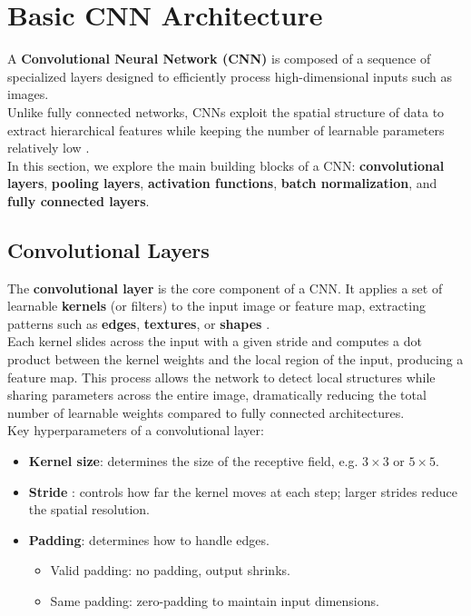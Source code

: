 \chapter{Basic CNN Architecture}
\label{ch:basic_cnn_arch}%

A \textbf{Convolutional Neural Network (CNN)} is composed of a sequence of specialized layers designed to efficiently process high-dimensional inputs such as images.
\\
Unlike fully connected networks, CNNs exploit the spatial structure of data to extract hierarchical features while keeping the number of learnable parameters relatively low \cite{goodfellow2016deep}.
\\
In this section, we explore the main building blocks of a CNN: \textbf{convolutional layers}, \textbf{pooling layers}, \textbf{activation functions}, \textbf{batch normalization}, and \textbf{fully connected layers}.

\section{Convolutional Layers}

The \textbf{convolutional layer} is the core component of a CNN. It applies a set of learnable \textbf{kernels} (or filters) to the input image or feature map, extracting patterns such as \textbf{edges}, \textbf{textures}, or \textbf{shapes} \cite{goodfellow2016deep}.
\\
Each kernel slides across the input with a given stride and computes a dot product between the kernel weights and the local region of the input, producing a feature map.
This process allows the network to detect local structures while sharing parameters across the entire image, dramatically reducing the total number of learnable weights compared to fully connected architectures.
\\
Key hyperparameters of a convolutional layer:

\begin{itemize}
    \item \textbf{Kernel size}: determines the size of the receptive field, e.g. $3 \times 3$ or $5 \times 5$.
    \item \textbf{Stride} : controls how far the kernel moves at each step; larger strides reduce the spatial resolution.
    \item \textbf{Padding}: determines how to handle edges.

    \begin{itemize}
        \item Valid padding: no padding, output shrinks.
        \item Same padding: zero-padding to maintain input dimensions.
    \end{itemize}
\end{itemize}

